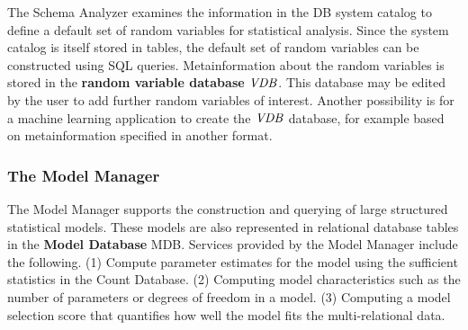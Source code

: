 \documentclass{acm_proc_article-sp}
\begin{document}
The Schema Analyzer examines the information in the DB system catalog to define a default set of random variables for statistical analysis.  Since the system catalog is itself stored in tables, the default set of random variables can be constructed using SQL queries. Metainformation about the random variables is stored in the \textbf{random variable database} $\it{VDB}$. This database may be edited by the user to add further random variables of interest. Another possibility is for a machine learning application to create the $\it{VDB}$ database, for example based on metainformation specified in another format.

%
%


\subsubsection{The Model Manager} 

The Model Manager supports the construction and querying of large structured statistical models. These models are also represented in relational database tables in the \textbf{Model Database} MDB. Services provided by the Model Manager include the following. (1) Compute parameter estimates for the model using the sufficient statistics in the Count Database.  (2) Computing model characteristics such as the number of parameters or degrees of freedom in a model. (3) Computing a model selection score that quantifies how well the model fits the multi-relational data. 
\end{document}
